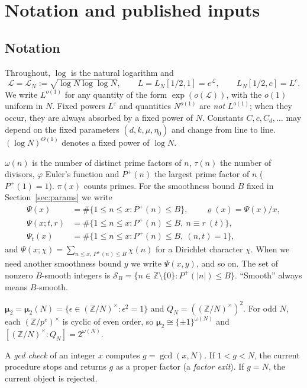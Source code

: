 \documentclass[11pt]{amsart}
\theoremstyle{definition}
\newcommand{\Z}{\mathbb{Z}}
\newcommand{\cL}{\mathcal{L}}
\newcommand{\cS}{\mathcal{S}}
\newcommand{\bmu}{\boldsymbol{\mu}_2}
\newcommand{\Pp}{P^{+}}
\begin{document}
\section{Notation and published inputs}\label{sec:notation}

\subsection{Notation}
Throughout, $\log$ is the natural logarithm and
\[
\cL=\cL_N:=\sqrt{\log N\log\log N},\qquad L=L_N[1/2,1]=e^{\cL},\qquad L_N[1/2,c]=L^c .
\]
We write $L^{o(1)}$ for any quantity of the form $\exp(o(\cL))$, with the $o(1)$ uniform in $N$.
Fixed powers $L^{\varepsilon}$ and quantities $N^{o(1)}$ are \emph{not} $L^{o(1)}$; when they occur, they
are always absorbed by a fixed power of $N$. Constants $C,c,C_d,\dots$ may depend on the fixed
parameters $(d,k,\mu,\eta_0)$ and change from line to line. $(\log N)^{O(1)}$ denotes a fixed power of
$\log N$.

$\omega(n)$ is the number of distinct prime factors of $n$, $\tau(n)$ the number of divisors,
$\varphi$ Euler's function and $\Pp(n)$ the largest prime factor of $n$ ($\Pp(1)=1$). $\pi(x)$ counts
primes. For the smoothness bound $B$ fixed in Section~\ref{sec:params} we write
\begin{align*}
\Psi(x)&=\#\{1\le n\le x:\Pp(n)\le B\},\qquad \varrho(x)=\Psi(x)/x,\\
\Psi(x;t,r)&=\#\{1\le n\le x:\Pp(n)\le B,\ n\equiv r\ (t)\},\\
\Psi_t(x)&=\#\{1\le n\le x:\Pp(n)\le B,\ (n,t)=1\},
\end{align*}
and $\Psi(x;\chi)=\sum_{n\le x,\,\Pp(n)\le B}\chi(n)$ for a Dirichlet character $\chi$. When we need
another smoothness bound $y$ we write $\Psi(x,y)$, and so on. The set of nonzero $B$-smooth
integers is $\cS_B=\{n\in\Z\setminus\{0\}:\Pp(|n|)\le B\}$. ``Smooth'' always means $B$-smooth.

$\bmu=\bmu(N)=\{\epsilon\in(\Z/N)^\times:\epsilon^2=1\}$ and $Q_N=((\Z/N)^\times)^2$. For odd $N$,
each $(\Z/p^e)^\times$ is cyclic of even order, so $\bmu\cong\{\pm1\}^{\omega(N)}$ and
$[(\Z/N)^\times:Q_N]=2^{\omega(N)}$.

A \emph{gcd check} of an integer $x$ computes $g=\gcd(x,N)$. If $1<g<N$, the current procedure stops
and returns $g$ as a proper factor (a \emph{factor exit}). If $g=N$, the current object is rejected.
\end{document}
